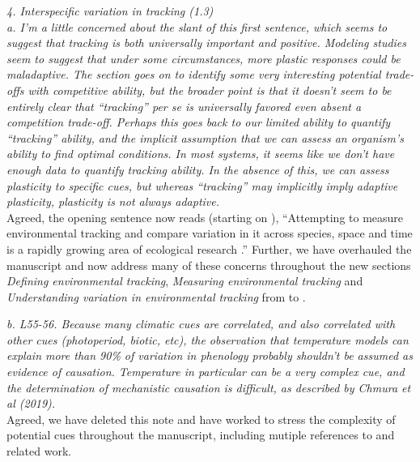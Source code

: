 \documentclass[11pt]{article}
\begin{document}
\emph{4.       Interspecific variation in tracking (1.3) \\
a.      I'm a little concerned about the slant of this first sentence, which seems to suggest
that tracking is both universally important and positive. Modeling studies seem to suggest
that under some circumstances, more plastic responses could be maladaptive.  The section goes
on to identify some very interesting potential trade-offs with competitive ability, but the
broader point is that it doesn't seem to be entirely clear that ``tracking'' per se is
universally favored even absent a competition trade-off. Perhaps this goes back to our
limited ability to quantify ``tracking'' ability, and the implicit assumption that we can
assess an organism's ability to find optimal conditions. In most systems, it seems like we
don't have enough data to quantify tracking ability. In the absence of this, we can assess
plasticity to specific cues, but whereas “tracking” may implicitly imply adaptive plasticity,
plasticity is not always adaptive.}\\

Agreed, the opening sentence now reads (starting on ), ``Attempting to measure environmental tracking and compare variation in it across species, space and time is a rapidly growing area of ecological research \citep[e.g.,]{Cook:2012pnas,fu2015,thackeray2016,cohen2018}.'' Further, we have overhauled the manuscript and now address many of these concerns throughout the new sections \emph{Defining environmental tracking}, \emph{Measuring environmental tracking} and \emph{Understanding variation in environmental tracking} from  to . 

\emph{b.      L55-56. Because many climatic cues are correlated, and also correlated with other
cues (photoperiod, biotic, etc), the observation that temperature models can explain more
than 90\% of variation in phenology probably shouldn't be assumed as evidence of causation.
Temperature in particular can be a very complex cue, and the determination of mechanistic
causation is difficult, as described by Chmura et al (2019).}\\

Agreed, we have deleted this note and have worked to stress the complexity of potential cues throughout the manuscript, including mutiple references to \citet{chmura2019} and related work.\\
\end{document}
